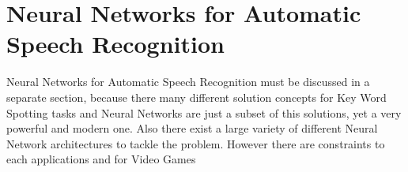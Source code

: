 \section{Neural Networks for Automatic Speech Recognition}
Neural Networks for Automatic Speech Recognition must be discussed in a separate section, because there many different solution concepts for Key Word Spotting tasks and Neural Networks are just a subset of this solutions, yet a very powerful and modern one. Also there exist a large variety of different Neural Network architectures to tackle the problem. However there are constraints to each applications and for Video Games